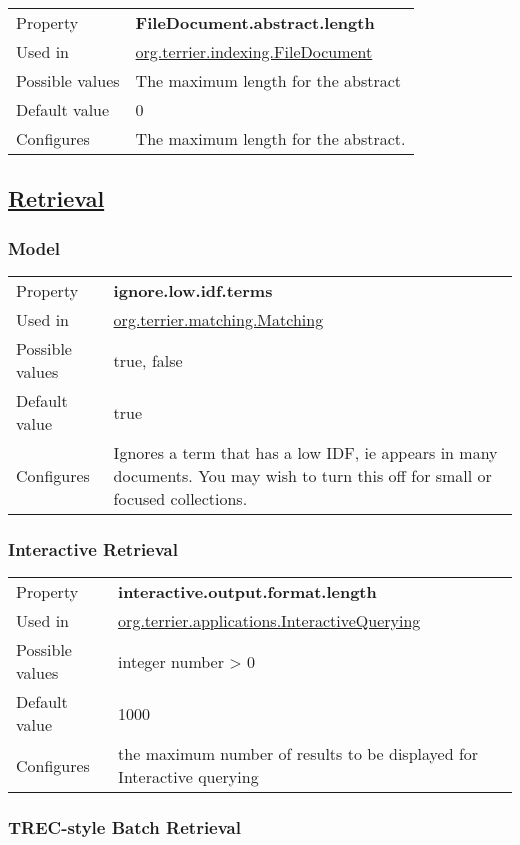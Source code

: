 \begin{longtable}[]{@{}ll@{}}
\toprule
Property & \textbf{FileDocument.abstract.length}\tabularnewline
Used in &
\href{javadoc/org/terrier/indexing/FileDocument.html}{org.terrier.indexing.FileDocument}\tabularnewline
Possible values & The maximum length for the abstract\tabularnewline
Default value & 0\tabularnewline
Configures & The maximum length for the abstract.\tabularnewline
\bottomrule
\end{longtable}

\hypertarget{retrieval}{\subsection{\texorpdfstring{\href{}{Retrieval}}{Retrieval}}\label{retrieval}}

\subsubsection{Model}\label{model}

\begin{longtable}[]{@{}ll@{}}
\toprule
Property & \textbf{ignore.low.idf.terms}\tabularnewline
Used in &
\href{javadoc/org/terrier/matching/Matching.html}{org.terrier.matching.Matching}\tabularnewline
Possible values & true, false\tabularnewline
Default value & true\tabularnewline
Configures & Ignores a term that has a low IDF, ie appears in many
documents. You may wish to turn this off for small or focused
collections.\tabularnewline
\bottomrule
\end{longtable}

\subsubsection{Interactive Retrieval}\label{interactive-retrieval}

\begin{longtable}[]{@{}ll@{}}
\toprule
Property & \textbf{interactive.output.format.length}\tabularnewline
Used in &
\href{javadoc/org/terrier/applications/InteractiveQuerying.html}{org.terrier.applications.InteractiveQuerying}\tabularnewline
Possible values & integer number \textgreater{} 0\tabularnewline
Default value & 1000\tabularnewline
Configures & the maximum number of results to be displayed for
Interactive querying\tabularnewline
\bottomrule
\end{longtable}

\subsubsection{TREC-style Batch
Retrieval}\label{trec-style-batch-retrieval}

